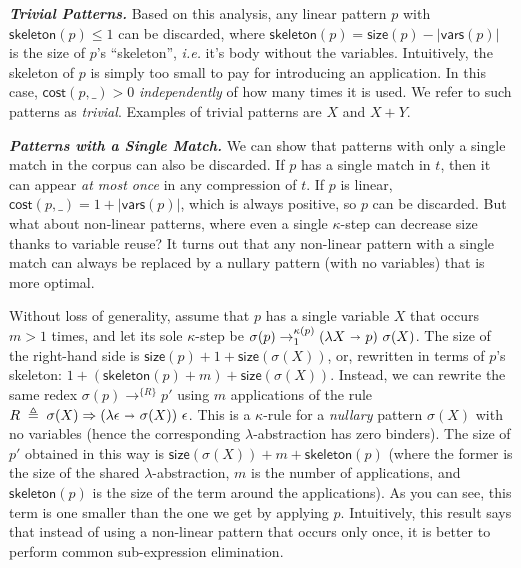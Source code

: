 \documentclass[acmsmall,screen,nonacm,review=false,timestamp=false]{acmart}
\newcommand{\ie}{\emph{i.e.}\xspace}
\newcommand{\emphbf}[1]{\emph{\textbf{#1}\xspace}}
\newcommand{\mypara}[1]{\smallskip\noindent\emphbf{#1.}\xspace}
\newcommand{\fv}{\mathsf{vars}}
\newcommand{\sz}{\mathsf{size}}
\newcommand{\sk}{\mathsf{skeleton}}
\newcommand{\sapp}[2]{{#1}({#2})}
\newcommand{\bnd}{\ \mathbf{\shortrightarrow}\ }
\newcommand{\rwsteps}[1]{\rightarrow^{#1}_1}
\newcommand{\rewrites}[1]{\rightarrow^{#1}}
\begin{document}
\mypara{Trivial Patterns}
Based on this analysis, any linear pattern $p$
 with $\sk(p) \leq 1$ can be discarded,
 where $\sk(p) = \sz(p) - |\fv(p)|$ is the size of $p$'s ``skeleton'', \ie it's body without the variables.
Intuitively, the skeleton of $p$ is simply too small to pay for introducing an application.
In this case, $\mathsf{cost}(p,\_) > 0$ \emph{independently} of how many times it is used.
We refer to such patterns as \emph{trivial}.
Examples of trivial patterns are $X$ and $X + Y$.




\mypara{Patterns with a Single Match}
We can show that patterns with only a single match in the corpus can also be discarded.
If $p$ has a single match in $t$,
then it can appear \emph{at most once} in any compression of $t$.
If $p$ is linear, $\mathsf{cost}(p, \_) = 1 + |\fv(p)|$,
which is always positive, so $p$ can be discarded.
But what about non-linear patterns, where even a single $\kappa$-step can decrease size thanks to variable reuse?
It turns out that any non-linear pattern with a single match
can always be replaced by a nullary pattern (with no variables) that is more optimal.

Without loss of generality, assume that $p$ has a single variable $X$ that occurs $m > 1$ times,
and let its sole $\kappa$-step be $\sapp{\sigma}{p} \rwsteps{\kappa(p)}  (\lambda X \bnd p)\  \sapp{\sigma}{X}$.
The size of the right-hand side is $\sz(p) + 1 + \sz(\sapp{\sigma}{X})$,
or, rewritten in terms of $p$'s skeleton: $1 + (\sk(p) + m) + \sz(\sapp{\sigma}{X})$.
Instead, we can rewrite the same redex $\sapp{\sigma}{p} \rewrites{\{R\}} p'$
using $m$ applications of the rule $R \;\triangleq\; \sapp{\sigma}{X} \Rightarrow (\lambda \epsilon \bnd \sapp{\sigma}{X})\ \epsilon$.
This is a $\kappa$-rule for a \emph{nullary} pattern $\sapp{\sigma}{X}$ with no variables
(hence the corresponding $\lambda$-abstraction has zero binders).
The size of $p'$ obtained in this way is $\sz(\sapp{\sigma}{X}) + m + \sk(p)$
(where the former is the size of the shared $\lambda$-abstraction, $m$ is the number of applications, 
and $\sk(p)$ is the size of the term around the applications).
As you can see, this term is one smaller than the one we get by applying $p$.
Intuitively, this result says that instead of using a non-linear pattern that occurs only once,
it is better to perform common sub-expression elimination.
\end{document}
